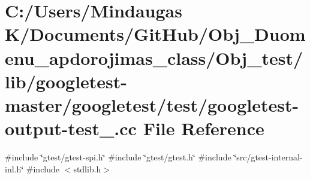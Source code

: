\hypertarget{_obj__test_2lib_2googletest-master_2googletest_2test_2googletest-output-test___8cc}{}\section{C\+:/\+Users/\+Mindaugas K/\+Documents/\+Git\+Hub/\+Obj\+\_\+\+Duomenu\+\_\+apdorojimas\+\_\+class/\+Obj\+\_\+test/lib/googletest-\/master/googletest/test/googletest-\/output-\/test\+\_\+.cc File Reference}
\label{_obj__test_2lib_2googletest-master_2googletest_2test_2googletest-output-test___8cc}
{\ttfamily \#include \char`\"{}gtest/gtest-\/spi.\+h\char`\"{}}\newline
{\ttfamily \#include \char`\"{}gtest/gtest.\+h\char`\"{}}\newline
{\ttfamily \#include \char`\"{}src/gtest-\/internal-\/inl.\+h\char`\"{}}\newline
{\ttfamily \#include $<$stdlib.\+h$>$}\newline
